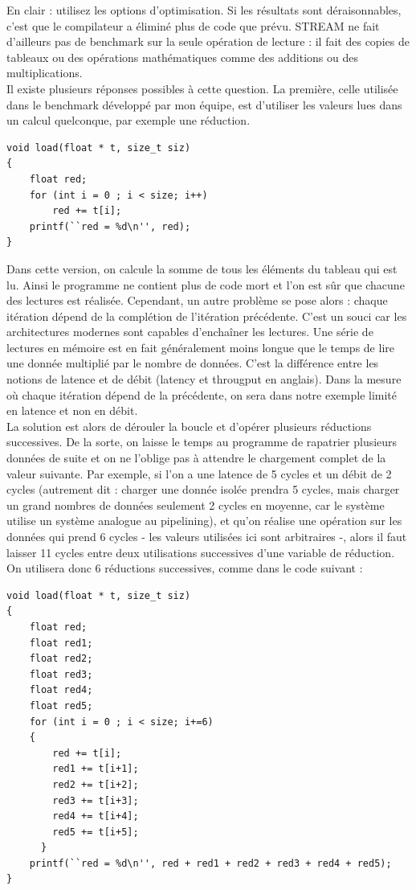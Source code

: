\documentclass{report}
\begin{document}
En clair : utilisez les options d'optimisation. Si les résultats sont déraisonnables, c'est que le 
compilateur a éliminé plus de code que prévu. STREAM ne fait d'ailleurs pas de benchmark sur la seule
opération de lecture : il fait des copies de tableaux ou des opérations mathématiques comme des additions
ou des multiplications.
\\Il existe plusieurs réponses possibles à cette question. La première, celle utilisée dans le benchmark
développé par mon équipe, est d'utiliser les valeurs lues dans un calcul quelconque, par exemple une 
réduction.
\begin{lstlisting}
void load(float * t, size_t siz)
{
    float red;
    for (int i = 0 ; i < size; i++)
        red += t[i]; 
    printf(``red = %d\n'', red); 
}
\end{lstlisting}
Dans cette version, on calcule la somme de tous les éléments du tableau qui est lu. Ainsi le programme
ne contient plus de code mort et l'on est sûr que chacune des lectures est réalisée. Cependant, un autre
problème se pose alors : chaque itération dépend de la complétion de l'itération précédente. C'est un souci
car les architectures modernes sont capables d'enchaîner les lectures. Une série de lectures
en mémoire est en fait généralement moins longue que le temps de lire une donnée multiplié par le nombre
de données. C'est la différence entre les notions de latence et de débit (latency et througput en 
anglais). Dans la mesure où chaque itération dépend de la précédente, on sera dans notre exemple
limité en latence et non en débit.
\\La solution est alors de dérouler la boucle et d'opérer plusieurs réductions successives. De la
sorte, on laisse le temps au programme de rapatrier plusieurs données de suite et on ne l'oblige pas
à attendre le chargement complet de la valeur suivante. Par exemple, si l'on a une latence de 5 cycles
et un débit de 2 cycles (autrement dit : charger une donnée isolée prendra 5 cycles, mais charger un grand
nombres de données seulement 2 cycles en moyenne, car le système utilise un système analogue au 
pipelining), et qu'on réalise une opération sur les données qui prend 6 cycles - les valeurs utilisées
ici sont arbitraires -, alors il faut laisser 11 cycles entre deux utilisations successives d'une 
variable de réduction. On utilisera donc 6 réductions successives, comme dans le code suivant :
\begin{lstlisting}
void load(float * t, size_t siz)
{
    float red;
    float red1;
    float red2;
    float red3;
    float red4;
    float red5;
    for (int i = 0 ; i < size; i+=6)
    {
        red += t[i]; 
        red1 += t[i+1]; 
        red2 += t[i+2]; 
        red3 += t[i+3]; 
        red4 += t[i+4]; 
        red5 += t[i+5]; 
      }
    printf(``red = %d\n'', red + red1 + red2 + red3 + red4 + red5); 
}
\end{lstlisting}
\end{document}
